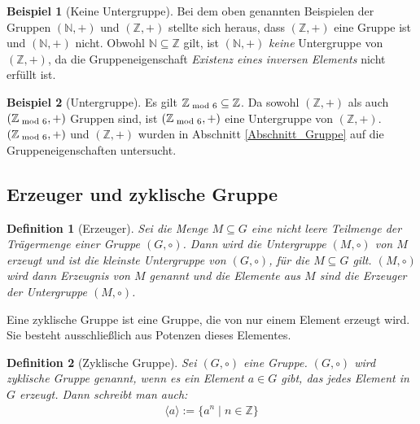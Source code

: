 \documentclass[12pt,a4paper, usenames, dvipsnames]{article}
\theoremstyle{mystyle}
\newtheorem{definition}{Definition}
\theoremstyle{definition}
\newtheorem{bsp}{Beispiel}[definition]
\begin{document}
\begin{bsp}[Keine Untergruppe]

Bei dem oben genannten Beispielen der Gruppen $(\mathbb{N},+)$ und $(\mathbb{Z},+)$ stellte sich heraus, dass $(\mathbb{Z},+)$ eine Gruppe ist und $(\mathbb{N},+)$ nicht. Obwohl $\mathbb{N \subseteq \mathbb{Z}}$ gilt, ist $(\mathbb{N},+)$ \textit{keine} Untergruppe von $(\mathbb{Z},+)$, da die Gruppeneigenschaft \textit{Existenz eines inversen Elements} nicht erfüllt ist.

\end{bsp}
\begin{bsp}[Untergruppe]

Es gilt $\mathbb{Z}_{\hspace*{-0.3em}\mod 6} \subseteq \mathbb{Z}$. Da sowohl $(\mathbb{Z},+)$ als auch $(\mathbb{Z}_{\hspace*{-0.3em}\mod 6}, +)$ Gruppen sind, ist $(\mathbb{Z}_{\hspace*{-0.3em}\mod 6}, +)$ eine Untergruppe von $(\mathbb{Z},+)$. $(\mathbb{Z}_{\hspace*{-0.3em}\mod 6}, +)$ und $(\mathbb{Z},+)$ wurden in Abschnitt \ref{Abschnitt_Gruppe} auf die Gruppeneigenschaften untersucht.

\end{bsp}

%
%
%
%
%
%
%
%
%
%

\subsection{Erzeuger und zyklische Gruppe} 
\label{Abschnitt_Erzeuger}


\begin{definition}[Erzeuger]
Sei die Menge $M \subseteq G$ eine nicht leere Teilmenge der Trägermenge einer Gruppe $(G, \circ)$. 
Dann wird die Untergruppe $(M, \circ)$ von $M$ erzeugt und ist die kleinste Untergruppe von $(G, \circ)$, für die $M \subseteq G$ gilt.
$(M, \circ)$ wird dann Erzeugnis von $M$ genannt und die Elemente aus $M$ sind die Erzeuger der Untergruppe $(M, \circ)$.
\end{definition}

Eine zyklische Gruppe ist eine Gruppe, die von nur einem Element erzeugt wird. Sie besteht ausschließlich aus Potenzen dieses Elementes.

\begin{definition}[Zyklische Gruppe]
Sei $(G, \circ)$ eine Gruppe. $(G, \circ)$ wird zyklische Gruppe genannt, wenn es ein Element $a \in G$ gibt, das jedes Element in $G$ erzeugt. Dann schreibt man auch:
\begin{align*}
\langle a \rangle := \{ a^n \mid n \in \mathbb{Z} \}
\end{align*}

\end{definition}
\end{document}
